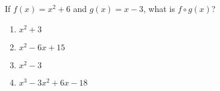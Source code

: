 \bigskip

\item If $f(x)=x^2+6$ and $g(x)=x-3$, what is $f\circ g(x)$?

    \begin{enumerate}
    \item $x^2+3$
    \item $x^2-6x+15$
    \item $x^2-3$
    \item $x^3-3x^2+6x-18$
    \end{enumerate}

